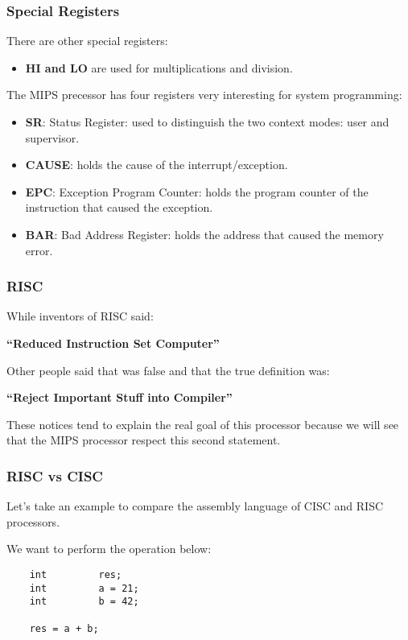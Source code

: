 \begin{frame}
  \frametitle{Special Registers}

  There are other special registers:

  \begin{itemize}[<+->]
    \item
      \textbf{HI and LO} are used for multiplications and division.
  \end{itemize}

  The MIPS precessor has four registers very interesting for system
  programming:

  \begin{itemize}[<+->]
    \item
      \textbf{SR}: Status Register: used to distinguish the two context
      modes: user and supervisor.
    \item
      \textbf{CAUSE}: holds the cause of the interrupt/exception.
    \item
      \textbf{EPC}: Exception Program Counter: holds the program counter
      of the instruction that caused the exception.
    \item
      \textbf{BAR}: Bad Address Register: holds the address that caused
      the memory error.
  \end{itemize}
\end{frame}


\begin{frame}
  \frametitle{RISC}

  While inventors of RISC said:

  \nl

  \textbf{``Reduced Instruction Set Computer''}

  \nl

  Other people said that was false and that the true definition was:

  \nl

  \textbf{``Reject Important Stuff into Compiler''}

  \nl

  These notices tend to explain the real goal of this processor because
  we will see that the MIPS processor respect this second statement.
\end{frame}


\begin{frame}[containsverbatim]
  \frametitle{RISC vs CISC}

  Let's take an example to compare the assembly language of CISC and RISC
  processors.

  \nl

  We want to perform the operation below:

  \begin{verbatim}
    int         res;
    int         a = 21;
    int         b = 42;

    res = a + b;
  \end{verbatim}
\end{frame}

